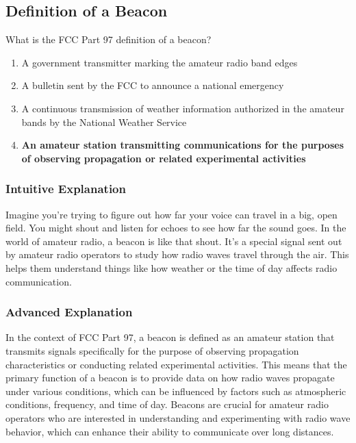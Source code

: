 \subsection{Definition of a Beacon} \label{T1A06}

\begin{tcolorbox}[colback=gray!10!white,colframe=black!75!black,title=T1A06]
What is the FCC Part 97 definition of a beacon?
\begin{enumerate}[label=\Alph*,noitemsep]
    \item A government transmitter marking the amateur radio band edges
    \item A bulletin sent by the FCC to announce a national emergency
    \item A continuous transmission of weather information authorized in the amateur bands by the National Weather Service
    \item \textbf{An amateur station transmitting communications for the purposes of observing propagation or related experimental activities}
\end{enumerate}
\end{tcolorbox}

\subsubsection{Intuitive Explanation}
Imagine you're trying to figure out how far your voice can travel in a big, open field. You might shout and listen for echoes to see how far the sound goes. In the world of amateur radio, a beacon is like that shout. It's a special signal sent out by amateur radio operators to study how radio waves travel through the air. This helps them understand things like how weather or the time of day affects radio communication.

\subsubsection{Advanced Explanation}
In the context of FCC Part 97, a beacon is defined as an amateur station that transmits signals specifically for the purpose of observing propagation characteristics or conducting related experimental activities. This means that the primary function of a beacon is to provide data on how radio waves propagate under various conditions, which can be influenced by factors such as atmospheric conditions, frequency, and time of day. Beacons are crucial for amateur radio operators who are interested in understanding and experimenting with radio wave behavior, which can enhance their ability to communicate over long distances.